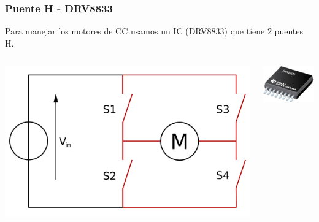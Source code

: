 \documentclass[compress]{beamer}
\begin{document}
\begin{frame}
 \frametitle{Puente H - DRV8833}
Para manejar los motores de CC usamos un IC (DRV8833) que tiene 2 puentes H.
\begin{columns}
\begin{center}
 \includegraphics[width=\columnwidth]{./img/puenteH_1.png}
\end{center}
\begin{center}
 \includegraphics[width=\columnwidth]{./img/l298.jpg}
\end{center}

\end{columns}
\end{frame}
\end{document}
